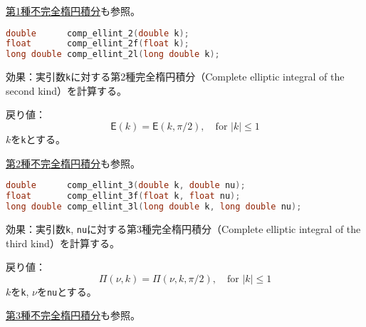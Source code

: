 \noindent
\hyperref[section8-11]{第1種不完全楕円積分}も参照。

%

\bgroup
\begin{lstlisting}[language=C++, aboveskip=0.0zw]
double      comp_ellint_2(double k);
float       comp_ellint_2f(float k);
long double comp_ellint_2l(long double k);
\end{lstlisting}
\egroup

\noindent
\textsf{効果}：実引数\lstinline!k!に対する第2種完全楕円積分（Complete
elliptic integral of the second kind）を計算する。

\noindent
\textsf{戻り値}：
\[
  \mathsf{E}(k) =
  \mathsf{E}(k, \pi / 2),
\quad \mbox{for $|k| \le 1$}
\]
\hspace*{3em}\(k\)を\lstinline!k!とする。

\noindent
\hyperref[section8-12]{第2種不完全楕円積分}も参照。

%

\bgroup
\begin{lstlisting}[language=C++, aboveskip=0.0zw]
double      comp_ellint_3(double k, double nu);
float       comp_ellint_3f(float k, float nu);
long double comp_ellint_3l(long double k, long double nu);
\end{lstlisting}
\egroup

\noindent
\textsf{効果}：実引数\lstinline!k!,
\lstinline!nu!に対する第3種完全楕円積分（Complete elliptic integral of
the third kind）を計算する。

\noindent
\textsf{戻り値}：
\[
  \mathsf{\Pi}(\nu, k) = \mathsf{\Pi}(\nu, k, \pi / 2),
        \quad \mbox{for $|k| \le 1$}
\]
\hspace*{3em}\(k\)を\lstinline!k!, \(\nu\)を\lstinline!nu!とする。

\noindent
\hyperref[section8-13]{第3種不完全楕円積分}も参照。

%

